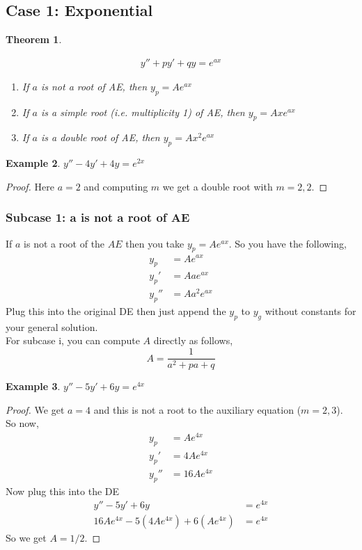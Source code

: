 \documentclass[oneside,11pt,pdftex,final]{book}%
\numberwithin{equation}{section}
\newtheorem{theorem}{Theorem}[chapter]%
\newtheorem{example}[theorem]{Example}
\numberwithin{section}{chapter}
\numberwithin{equation}{chapter}
\begin{document}
\subsection{Case 1: Exponential}
\begin{theorem}\label{th:udcexp}


\begin{align}
	y''+py'+qy=e^{ax} \label{eq:udcexp}
\end{align}
\begin{enumerate}
	\item If $ a $ is not a root of AE, then $ y_p =Ae^{ax}$
	\item If $ a $ is a simple root (i.e. multiplicity 1) of AE, then $ y_p=Ax e^{ax} $
	\item If $ a $ is a double root of AE, then $ y_p=A x^2 e^{ax} $
\end{enumerate}
\end{theorem}
\begin{example}
	$ y''-4y'+4y=e^{2x} $
\end{example}
\begin{proof}
	Here $ a=2 $ and computing $ m $ we get a double root with $ m=2,2 $.
\end{proof}

\subsubsection{Subcase 1: a is not a root of AE}
If $ a $ is not a root of the $ AE $ then you take $ y_p=Ae^{ax}$. So you have the following,
\begin{align*}
	y_p&=Ae^{ax}\\
	y_p'&=Aae^{ax}\\
	y_p''&=Aa^2e^{ax}
\end{align*}
Plug this into the original DE then just append the $ y_p $ to $ y_g $ without constants for your general solution.\\

For subcase i, you can compute $ A $ directly as follows, \[ A=\frac{1}{a^2+pa+q} \]


\begin{example}
	$ y''-5y'+6y=e^{4x} $
\end{example}
\begin{proof}
	We get $ a=4 $ and this is not a root to the auxiliary equation ($ m=2,3 $).\\
	So now,
	\begin{align*}
		 y_p&=Ae^{4x}\\
		 y_p'&=4Ae^{4x}\\
		 y_p''&=16Ae^{4x}
	\end{align*}
Now plug this into the DE
\begin{align*}
	y''-5y'+6y&=e^{4x}\\
	16Ae^{4x}-5(4Ae^{4x})+6(Ae^{4x})&=e^{4x}
\end{align*}
So we get $ A=1/2 $.
\end{proof}
\end{document}
